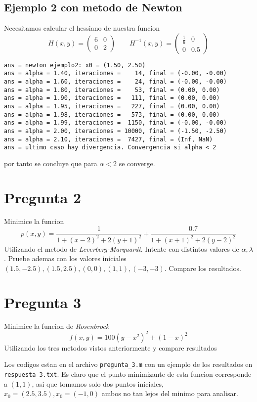 \documentclass[letterpaper]{article}
\begin{document}
\subsection*{Ejemplo 2 con metodo de Newton}
\noindent Necesitamos calcular el hessiano de nuestra funcion
\[ H(x,y) =
  \begin{pmatrix}
    6 & 0 \\
    0 & 2
  \end{pmatrix}
  \qquad
  H^{-1}(x,y) =
  \begin{pmatrix}
    \frac{1}{6} & 0 \\
    0 & 0.5
  \end{pmatrix}
\]
\begin{verbatim}
ans = newton ejemplo2: x0 = (1.50, 2.50)
ans = alpha = 1.40, iteraciones =    14, final = (-0.00, -0.00)
ans = alpha = 1.60, iteraciones =    24, final = (-0.00, -0.00)
ans = alpha = 1.80, iteraciones =    53, final = (0.00, 0.00)
ans = alpha = 1.90, iteraciones =   111, final = (0.00, 0.00)
ans = alpha = 1.95, iteraciones =   227, final = (0.00, 0.00)
ans = alpha = 1.98, iteraciones =   573, final = (0.00, 0.00)
ans = alpha = 1.99, iteraciones =  1150, final = (-0.00, -0.00)
ans = alpha = 2.00, iteraciones = 10000, final = (-1.50, -2.50)
ans = alpha = 2.10, iteraciones =  7427, final = (Inf, NaN)
ans = ultimo caso hay divergencia. Convergencia si alpha < 2
\end{verbatim}
por tanto se concluye que para \(\alpha < 2\) se converge.

\section*{Pregunta 2}
\noindent Minimice la funcion
\[ p(x,y) = \frac{1}{1 + (x-2)^2 + 2 (y+1)^2} + \frac{0.7}{1 + (x+1)^2 +
    2 (y - 2)^2 } \]
Utilizando el metodo de \emph{Leverberg-Marquardt}. Intente con distintos
valores de \(\alpha, \lambda\). Pruebe ademas con los valores iniciales
\((1.5, -2.5), (1.5, 2.5), (0,0), (1,1), (-3,-3)\). Compare los resultados.

\section*{Pregunta 3}
\noindent Minimice la funcion de \emph{Rosenbrock}
\[ f(x,y) = 100 (y - x^2)^2 + (1 - x)^2 \]
Utilizando los tres metodos vistos anteriormente y compare resultados
\newline

Los codigos estan en el archivo \texttt{pregunta\_3.m} con un ejemplo de
los resultados en \texttt{respuesta\_3.txt}. Es claro que el punto
minimizante de esta funcion corresponde a \((1,1)\), asi que tomamos solo
dos puntos iniciales, \(x_0 = (2.5, 3.5), x_0 = (-1,0) \) ambos no tan
lejos del minimo para analisar.
\end{document}

